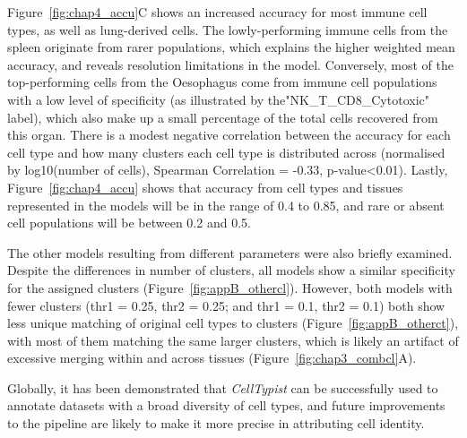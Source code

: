 Figure~\ref{fig:chap4_accu}C shows an increased accuracy for most immune cell types, as well as lung-derived cells. The lowly-performing immune cells from the spleen originate from rarer populations, which explains the higher weighted mean accuracy, and reveals resolution limitations in the model.  Conversely, most of the top-performing cells from the Oesophagus come from immune cell populations with a low level of specificity (as illustrated by the"NK\_T\_CD8\_Cytotoxic" label), which also make up a small percentage of the total cells recovered from this organ. There is a modest negative correlation between the accuracy for each cell type and how many clusters each cell type is distributed across (normalised by log10(number of cells), Spearman Correlation = -0.33, p-value<0.01). Lastly, Figure~\ref{fig:chap4_accu} shows that accuracy from cell types and tissues represented in the models will be in the range of 0.4 to 0.85, and rare or absent cell populations will be between 0.2 and 0.5.

The other models resulting from different parameters were also briefly examined. Despite the differences in number of clusters, all models show a similar specificity for the assigned clusters (Figure~\ref{fig:appB_othercl}). However, both models with fewer clusters (thr1 = 0.25, thr2 = 0.25; and thr1 = 0.1, thr2 = 0.1) both show less unique matching of original cell types to clusters (Figure~\ref{fig:appB_otherct}), with most of them matching the same larger clusters, which is likely an artifact of excessive merging within and across tissues (Figure~\ref{fig:chap3_combcl}A). 

Globally, it has been demonstrated that \textit{CellTypist} can be successfully used to annotate datasets with a broad diversity of cell types, and future improvements to the pipeline are likely to make it more precise in attributing cell identity. 



